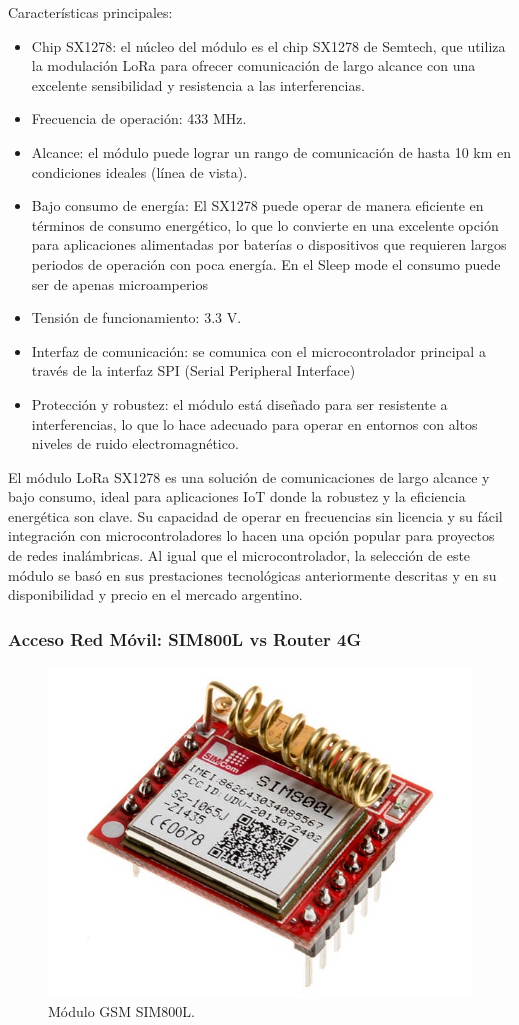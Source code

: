 Características principales:
\begin{itemize}
    \item Chip SX1278: el núcleo del módulo es el chip SX1278 de Semtech, que utiliza la modulación LoRa para ofrecer comunicación de largo alcance con una excelente sensibilidad y resistencia a las interferencias.
    \item Frecuencia de operación: 433 MHz.
    \item Alcance: el módulo puede lograr un rango de comunicación de hasta 10 km en condiciones ideales (línea de vista).
    \item Bajo consumo de energía: El SX1278 puede operar de manera eficiente en términos de consumo energético, lo que lo convierte en una excelente opción para aplicaciones alimentadas por baterías o dispositivos que requieren largos periodos de operación con poca energía. En el Sleep mode el consumo puede ser de apenas microamperios
    \item Tensión de funcionamiento: 3.3 V.
    \item Interfaz de comunicación: se comunica con el microcontrolador principal a través de la interfaz SPI (Serial Peripheral Interface)
    \item Protección y robustez: el módulo está diseñado para ser resistente a interferencias, lo que lo hace adecuado para operar en entornos con altos niveles de ruido electromagnético.
\end{itemize}

El módulo LoRa SX1278 es una solución de comunicaciones de largo alcance y bajo consumo, ideal para aplicaciones IoT donde la robustez y la eficiencia energética son clave. Su capacidad de operar en frecuencias sin licencia y su fácil integración con microcontroladores lo hacen una opción popular para proyectos de redes inalámbricas. Al igual que el microcontrolador, la selección de este módulo se basó en sus prestaciones tecnológicas anteriormente descritas y en su disponibilidad y precio en el mercado argentino.

\subsubsection{Acceso Red Móvil: SIM800L vs Router 4G}

\begin{figure}[H]
    \centering
    \includegraphics[width=0.5\linewidth]{Figures//Hardware//Modulos/1-SIM800L-Module.jpg}
    \caption{Módulo GSM SIM800L.}
    \label{fig:enter-label}
\end{figure}

